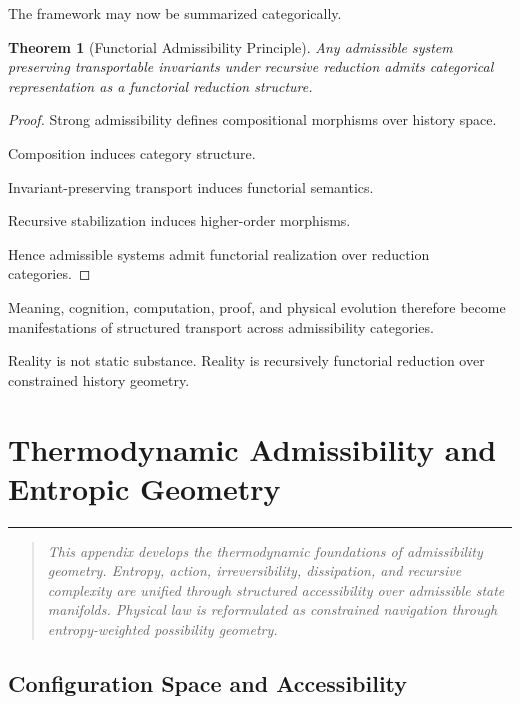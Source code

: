 \documentclass[12pt,openany]{book}
\theoremstyle{plain}
\newtheorem{theorem}{Theorem}[chapter]
\theoremstyle{definition}
\theoremstyle{remark}
\newcommand{\chapterrule}{%
  \vspace{4pt}%
  {\color{SpherepopBlue}\rule{\textwidth}{0.8pt}}%
  \vspace{10pt}%
}
\newenvironment{chapterprecis}{%
  \begin{quote}\small\itshape}{%
  \end{quote}\medskip}
\begin{document}
The framework may now be summarized categorically.

\begin{theorem}[Functorial Admissibility Principle]
Any admissible system preserving transportable invariants under
recursive reduction admits categorical representation as a
functorial reduction structure.
\end{theorem}

\begin{proof}
Strong admissibility defines compositional morphisms over history
space.

Composition induces category structure.

Invariant-preserving transport induces functorial semantics.

Recursive stabilization induces higher-order morphisms.

Hence admissible systems admit functorial realization over
reduction categories.
\end{proof}

Meaning, cognition, computation, proof, and physical evolution
therefore become manifestations of structured transport across
admissibility categories.

Reality is not static substance. Reality is recursively functorial reduction over constrained
history geometry.


\chapter{Thermodynamic Admissibility and Entropic Geometry}
\chapterrule

\begin{chapterprecis}
This appendix develops the thermodynamic foundations of
admissibility geometry. Entropy, action, irreversibility,
dissipation, and recursive complexity are unified through
structured accessibility over admissible state manifolds.
Physical law is reformulated as constrained navigation through
entropy-weighted possibility geometry.
\end{chapterprecis}

\section{Configuration Space and Accessibility}
\end{document}
